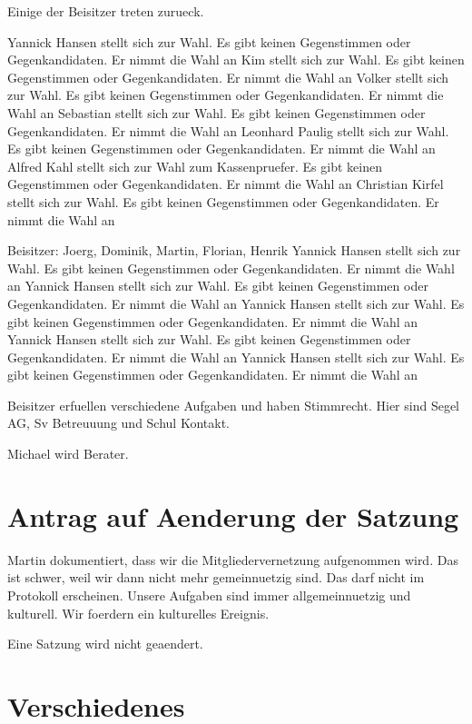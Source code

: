 \documentclass[a4paper, 11pt]{article}
\begin{document}
Einige der Beisitzer treten zurueck.

Yannick Hansen stellt sich zur Wahl. Es gibt keinen Gegenstimmen oder Gegenkandidaten. Er nimmt die Wahl an
Kim stellt sich zur Wahl. Es gibt keinen Gegenstimmen oder Gegenkandidaten. Er nimmt die Wahl an
Volker stellt sich zur Wahl. Es gibt keinen Gegenstimmen oder Gegenkandidaten. Er nimmt die Wahl an
Sebastian stellt sich zur Wahl. Es gibt keinen Gegenstimmen oder Gegenkandidaten. Er nimmt die Wahl an
Leonhard Paulig stellt sich zur Wahl. Es gibt keinen Gegenstimmen oder Gegenkandidaten. Er nimmt die Wahl an
Alfred Kahl stellt sich zur Wahl zum Kassenpruefer. Es gibt keinen Gegenstimmen oder Gegenkandidaten. Er nimmt die Wahl an
Christian Kirfel stellt sich zur Wahl. Es gibt keinen Gegenstimmen oder Gegenkandidaten. Er nimmt die Wahl an

Beisitzer: Joerg, Dominik, Martin, Florian, Henrik
Yannick Hansen stellt sich zur Wahl. Es gibt keinen Gegenstimmen oder Gegenkandidaten. Er nimmt die Wahl an
Yannick Hansen stellt sich zur Wahl. Es gibt keinen Gegenstimmen oder Gegenkandidaten. Er nimmt die Wahl an
Yannick Hansen stellt sich zur Wahl. Es gibt keinen Gegenstimmen oder Gegenkandidaten. Er nimmt die Wahl an
Yannick Hansen stellt sich zur Wahl. Es gibt keinen Gegenstimmen oder Gegenkandidaten. Er nimmt die Wahl an
Yannick Hansen stellt sich zur Wahl. Es gibt keinen Gegenstimmen oder Gegenkandidaten. Er nimmt die Wahl an

Beisitzer erfuellen verschiedene Aufgaben und haben Stimmrecht.
Hier sind Segel AG, Sv Betreuuung und Schul Kontakt.



Michael wird Berater.

\section*{Antrag auf Aenderung der Satzung}

Martin dokumentiert, dass wir die Mitgliedervernetzung aufgenommen wird.
Das ist schwer, weil wir dann nicht mehr gemeinnuetzig sind.
Das darf nicht im Protokoll erscheinen.
Unsere Aufgaben sind immer allgemeinnuetzig und kulturell.
Wir foerdern ein kulturelles Ereignis.

Eine Satzung wird nicht geaendert.

\section*{Verschiedenes}
\end{document}
